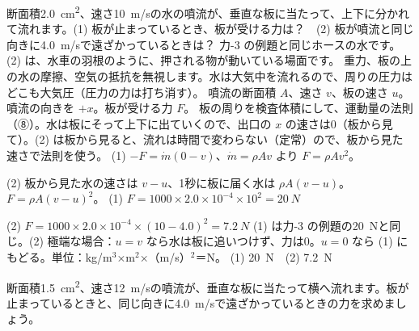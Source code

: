 \begin{phreidai}
\label{ph:力-13:ex9}断面積\qty{2.0}{cm^2}、速さ\qty{10}{m/s}の水の噴流が、垂直な板に当たって、上下に分かれて流れます。(1) 板が止まっているとき、板が受ける力は？　(2) 板が噴流と同じ向きに\qty{4.0}{m/s}で遠ざかっているときは？
\phbamen
力-3 の例題と同じホースの水です。(2) は、水車の羽根のように、押される物が動いている場面です。
\phmushi
重力、板の上の水の摩擦、空気の抵抗を無視します。水は大気中を流れるので、周りの圧力はどこも大気圧（圧力の力は打ち消す）。
\phzu
噴流の断面積 $A$、速さ $v$、板の速さ $u$。噴流の向きを $+x$。板が受ける力 $F$。
\phriyu
板の周りを検査体積にして、運動量の法則（⑧）。水は板にそって上下に出ていくので、出口の $x$ の速さは0（板から見て）。(2) は板から見ると、流れは時間で変わらない（定常）ので、板から見た速さで法則を使う。
\phtateru
(1) $-F=\dot m(0-v)$、$\dot m=\rho Av$ より $F=\rho Av^2$。\par
(2) 板から見た水の速さは $v-u$、1秒に板に届く水は $\rho A(v-u)$。$F=\rho A(v-u)^2$。
\phtoku
(1) $F=1000\times2.0\times10^{-4}\times10^2=\qty{20}{N}$\par
(2) $F=1000\times2.0\times10^{-4}\times(10-4.0)^2=\qty{7.2}{N}$
\phtashikame
(1) は力-3 の例題の\qty{20}{N}と同じ。(2) 極端な場合：$u=v$ なら水は板に追いつけず、力は0。$u=0$ なら (1) にもどる。単位：kg/m$^3$×m$^2$×（m/s）$^2$＝N。
\kotae (1) \qty{20}{N}　(2) \qty{7.2}{N}
\end{phreidai}
\begin{jibun}
断面積\qty{1.5}{cm^2}、速さ\qty{12}{m/s}の噴流が、垂直な板に当たって横へ流れます。板が止まっているときと、同じ向きに\qty{4.0}{m/s}で遠ざかっているときの力を求めましょう。
\end{jibun}

